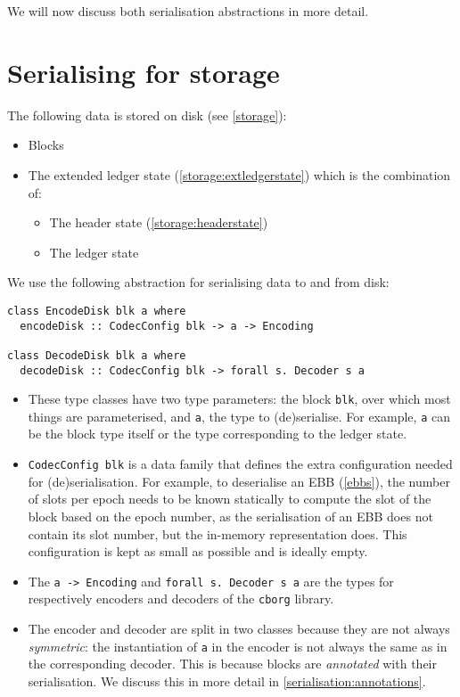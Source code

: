 We will now discuss both serialisation abstractions in more detail.

\section{Serialising for storage}
\label{serialisation:storage}

The following data is stored on disk (see \cref{storage}):

\begin{itemize}
\item Blocks
\item The extended ledger state (\cref{storage:extledgerstate}) which is the
  combination of:
  \begin{itemize}
  \item The header state (\cref{storage:headerstate})
  \item The ledger state
  \end{itemize}
\end{itemize}

We use the following abstraction for serialising data to and from disk:

\begin{lstlisting}
class EncodeDisk blk a where
  encodeDisk :: CodecConfig blk -> a -> Encoding

class DecodeDisk blk a where
  decodeDisk :: CodecConfig blk -> forall s. Decoder s a
\end{lstlisting}

\begin{itemize}
\item These type classes have two type parameters: the block \lstinline!blk!,
  over which most things are parameterised, and \lstinline!a!, the type to
  (de)serialise. For example, \lstinline!a! can be the block type itself or the
  type corresponding to the ledger state.
\item \lstinline!CodecConfig blk! is a data family that defines the extra
  configuration needed for (de)serialisation. For example, to deserialise an EBB
  (\cref{ebbs}), the number of slots per epoch needs to be known statically to
  compute the slot of the block based on the epoch number, as the serialisation
  of an EBB does not contain its slot number, but the in-memory representation
  does. This configuration is kept as small as possible and is ideally empty.
\item The \lstinline!a -> Encoding! and \lstinline!forall s. Decoder s a! are
  the types for respectively encoders and decoders of the \lstinline!cborg!
  library.
\item The encoder and decoder are split in two classes because they are not
  always \emph{symmetric}: the instantiation of \lstinline!a! in the encoder is
  not always the same as in the corresponding decoder. This is because blocks
  are \emph{annotated} with their serialisation. We discuss this in more detail
  in \cref{serialisation:annotations}.
\end{itemize}

